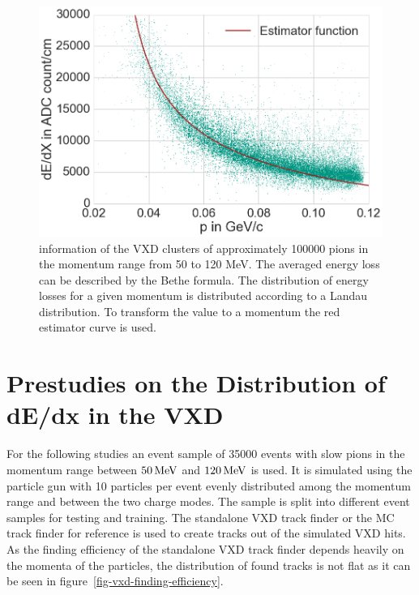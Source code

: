 \begin{figure}
 \centering
 \includegraphics[width=0.7\linewidth]{figures/vxd/dedxWithEstimator.png}
 \caption[\dedx information of the VXD clusters.]{\dedx information of the VXD clusters of approximately 100000 pions in the momentum range from 50 to 120 MeV. The averaged energy loss can be described by the Bethe formula. The distribution of energy losses for a given momentum is distributed according to a Landau distribution. To transform the \dedx value to a momentum the red estimator curve is used.}
 \label{fig-dedx-over-p}
\end{figure}


\section{Prestudies on the Distribution of dE/dx in the VXD}

For the following studies an event sample of 35000 events with slow pions in the momentum range between $\unit[50]{MeV}$ and $\unit[120]{MeV}$ is used. It is simulated using the particle gun with 10 particles per event evenly distributed among the momentum range and between the two charge modes. The sample is split into different event samples for testing and training. The standalone VXD track finder or the MC track finder for reference is used to create tracks out of the simulated VXD hits. As the finding efficiency of the standalone VXD track finder depends heavily on the momenta of the particles, the distribution of found tracks is not flat as it can be seen in figure~\ref{fig-vxd-finding-efficiency}. 

